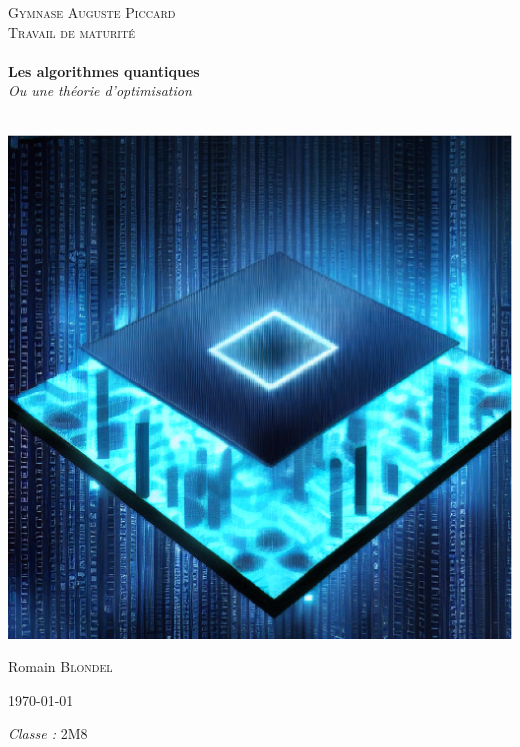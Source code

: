 
\begin{titlepage}
  \begin{sffamily}
  \begin{center}

    \textsc{\LARGE Gymnase Auguste Piccard}\\[2cm]

    \textsc{\Large Travail de maturité}\\[1.5cm]

    \HRule \\[0.4cm]
    { \huge \textbf{Les algorithmes quantiques} \\ \textit{Ou une théorie d'optimisation} \\[0.4cm] }

    \HRule \\[2cm]
    \includegraphics[scale=0.5]{images/page-de-garde/sd5.eps}
    \\[2cm]

	\vspace*{\fill}

    \begin{minipage}{0.3\textwidth}
      \begin{flushleft} \large
        Romain \textsc{Blondel}\\
      \end{flushleft}
    \end{minipage}
    \begin{minipage}{0.3\textwidth}
      \centering
      \today
    \end{minipage}
    \begin{minipage}{0.3\textwidth}
      \begin{flushright} \large
        \emph{Classe :} \textsc{2M8}\\
      \end{flushright}
    \end{minipage}


\end{center}
\end{sffamily}
\end{titlepage}
